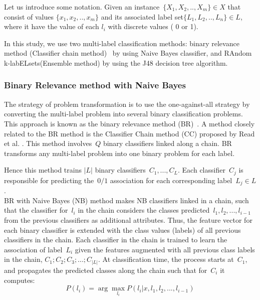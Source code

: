\documentclass[12pt]{article}
\begin{document}
Let us introduce some notation. Given an instance~$\{X_1,X_2,..,X_m\} \in X$ that consist of values $\{x_1,x_2,..,x_m\}$ and its associated label set$\{L_1,L_2,..,L_n\} \in L$, where it have the value of each $l_i$ with discrete values ( 0 or 1). 




 In this study, we use two multi-label classification methods: binary relevance method (Classifier chain method)~\cite{read2011classifier} by using Naive Bayes classifier, and RAndom k-labELsets(Ensemble method) \cite{Tsoumakas2011random} by using the J48 decision tree algorithm.


\subsubsection{Binary Relevance method with Naive Bayes}
The strategy of problem transformation is to use the one-against-all strategy by converting the multi-label problem into several binary classification problems. This approach is known as the binary relevance method (BR)~\cite{read2011classifier}. A method closely related to the BR method is the Classifier Chain method (CC) proposed by Read et al. \cite{read2011classifier}. This method involves~$Q$ binary classifiers linked along a chain. BR transforms any multi-label problem into one binary problem for each label. 

Hence this method trains $|L|$ binary classifiers~$C_1,...,C_{L}$. Each classifier~$C_j$ is responsible for predicting the~$0/1$ association for each corresponding label~$L_j \in L$.\\

BR with Naive Bayes (NB) method makes NB classifiers linked in a chain, such that the classifier for~$l_{i}$ in the chain considers the classes predicted~$l_1,l_2,...,l_{i-1}$ from the previous classifiers as additional attributes. Thus, the feature vector for each binary classifier is extended with the class values (labels) of all previous classifiers in the chain. Each classifier in the chain is trained to learn the association of label~$L_i$
given the features augmented with all previous class labels in the chain, $ C_1;C_2;C_3;...;C_{|L|}$. At classification time, the process starts at~$C_1$, and propagates the predicted classes along   the   chain   such   that   for~$C_i$ it   computes: 
\begin{equation}
P(l_i)= \arg \max_{l_i} P(l_i|x,l_1,l_2,...,l_{i-1}) 
\end{equation}
\end{document}
